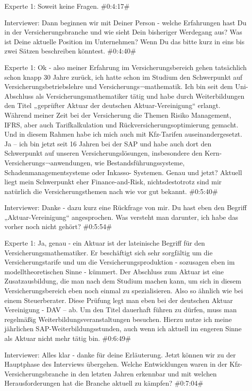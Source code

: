 Experte 1:
Soweit keine Fragen. 
\#0:4:17\#

Interviewer:
Dann beginnen wir mit Deiner Person - welche Erfahrungen hast Du in der Versicherungsbranche und wie sieht Dein bisheriger Werdegang aus? Was ist Deine aktuelle Position im Unternehmen? Wenn Du das bitte kurz in eins bis zwei Sätzen beschreiben könntest.
\#0:4:40\#

Experte 1:
Ok - also meiner Erfahrung im Versicherungsbereich gehen tatsächlich schon knapp 30 Jahre zurück, ich hatte schon im Studium den Schwerpunkt auf Versicherungsbetriebslehre und Versicherungs¬mathematik. Ich bin seit dem Uni-Abschluss als Versicherungsmathematiker tätig und habe durch Weiterbildungen den Titel „geprüfter Aktuar der deutschen Aktuar-Vereinigung“ erlangt. Während meiner Zeit bei der Versicherung die Themen Risiko Management, IFRS, aber auch Tarifkalkulation und Rückversicherungsoptimierung gemacht. Und in diesem Rahmen habe ich mich auch mit Kfz-Tarifen auseinandergesetzt. Ja – ich bin jetzt seit 16 Jahren bei der SAP und habe auch dort den Schwerpunkt auf unseren Versicherungslösungen, insbesondere den Kern-Versicherungs¬anwendungen, wie Bestandsführungssysteme, Schadenmanagementsysteme oder Inkasso- Systemen. Genau und jetzt? Aktuell liegt mein Schwerpunkt eher Finance-and-Risk, nichtsdestotrotz sind mir natürlich die Versicherungsthemen nach wie vor gut bekannt.
\#0:5:40\#

Interviewer:
Danke - dazu kurz eine Rückfrage von mir. Du hast eben den Begriff „Aktuar-Vereinigung“ angesprochen. Was versteht man darunter, ich habe das vorher noch nicht gehört?
\#0:5:54\#

Experte 1:
Ja, genau - ein Aktuar ist der lateinische Begriff für den Versicherungsmathematiker. Er beschäftigt sich sehr sorgfältig um die Versicherungstarife und um die Versicherungsproduktion - sozusagen eben im modelltheoretischen Sinne - kümmert. Der Abschluss zum Aktuar ist eine Zusatzausbildung, die man nach dem Studium machen kann, um sich in diesem Versicherungsbereich eben noch einmal zu spezialisieren. Also so ähnlich wie bei einem Steuerberater. Diese Prüfung legt man eben bei der deutschen Aktuar Vereinigung - DAV – ab. Um den Titel dauerhaft führen zu dürfen, muss man regelmäßig Weiterbildungsveranstaltungen besuchen. Hierzu nutze ich meine jährlichen SAP-Weiterbildungsstunden, auch wenn ich aktuell im engeren Sinne als Aktuar nicht mehr tätig bin. 
\#0:6:49\#

Interviewer:
Alles klar - danke für deine Erläuterung. Jetzt können wir zu der Hauptphase des Interviews übergehen. Welche Entwicklungen waren in der Kfz-Versicherungsbranche in den letzten Jahren erkennbar und mit welchen Herausforderungen hat die Branche aktuell zu kämpfen?
\#0:7:04\#

